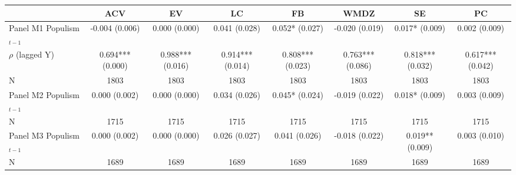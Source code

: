 \begin{tabular}{lccccccc}
\toprule
 & ACV & EV & LC & FB & WMDZ & SE & PC \\
\midrule
Panel M1 Populism$_{t-1}$ & -0.004 (0.006) & 0.000 (0.000) & 0.041 (0.028) & 0.052* (0.027) & -0.020 (0.019) & 0.017* (0.009) & 0.002 (0.009) \\
$\rho$ (lagged Y) & 0.694*** (0.000) & 0.988*** (0.016) & 0.914*** (0.014) & 0.808*** (0.023) & 0.763*** (0.086) & 0.818*** (0.032) & 0.617*** (0.042) \\
N & 1803 & 1803 & 1803 & 1803 & 1803 & 1803 & 1803 \\
Panel M2 Populism$_{t-1}$ & 0.000 (0.002) & 0.000 (0.000) & 0.034 (0.026) & 0.045* (0.024) & -0.019 (0.022) & 0.018* (0.009) & 0.003 (0.009) \\
N & 1715 & 1715 & 1715 & 1715 & 1715 & 1715 & 1715 \\
Panel M3 Populism$_{t-1}$ & 0.000 (0.002) & 0.000 (0.000) & 0.026 (0.027) & 0.041 (0.026) & -0.018 (0.022) & 0.019** (0.009) & 0.003 (0.010) \\
N & 1689 & 1689 & 1689 & 1689 & 1689 & 1689 & 1689 \\
\bottomrule
\end{tabular}
